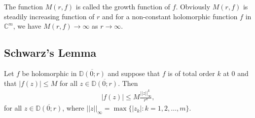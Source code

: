 \documentclass[11pt, reqno]{amsart}
\newcommand{\ol}{\overline}
\numberwithin{equation}{section}
\begin{document}
The function $M(r,f)$ is called the growth function of $f$. Obviously $M(r,f)$ is steadily increasing function of $r$ and for a non-constant holomorphic function $f$ in $\mathbb{C}^m$, we have $M(r,f)\to \infty$ as $r\to \infty$.


\subsection{\bf{Schwarz's Lemma}} \cite[pp. 8]{gr} Let $f$ be holomorphic in $\ol{\mathbb{D}(0;r)}$ and suppose that $f$ is of total order $k$ at $0$ and that $|f(z)|\leq M$ for all $z\in \ol{\mathbb{D}(0;r)}$. Then 
\begin{align*}
|f(z)|\leq M\frac{||z||_{\infty}^k}{r^k},
\end{align*}
for all $z\in \ol{\mathbb{D}(0;r)}$, where $||z||_{\infty}=\max\{|z_k|: k=1,2,\ldots,m\}$.
\end{document}
